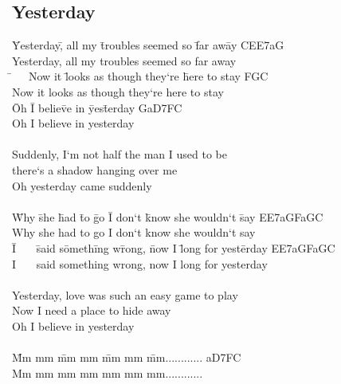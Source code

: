 \documentclass[10pt,a5paper,twoside, cleardoubleplain]{scrbook}
\begin{document}
    \subsection{Yesterday}
  \begin{tabbing}
\=Yesterday\=, all my \=troubles seemed so \=far aw\=ay\kill
\>C\>E\>E7\>a\>G\\
Yesterday, all my troubles seemed so far away\\


\=~~~Now it \=looks as though they`re \=here to stay\kill
\>F\>G\>C\\
Now it looks as though they`re here to stay\\


\=Oh \=I belie\=ve in \=yes\=terday\kill
\>G\>a\>D7\>F\>C\\
Oh I believe in yesterday\\
\\
Suddenly, I`m not half the man I used to be\\
there`s a shadow hanging over me\\
Oh yesterday came suddenly\\

\\
\=Why \=she \=had \=to \=go \=I don`t \=know she wouldn`t \=say\kill
\>E\>E7\>a\>G\>F\>a\>G\>C\\
Why she had to go I don`t know she wouldn`t say\\

\=I~~~ \=said s\=ometh\=ing w\=rong, \=now I \=long for yest\=erday\kill
\>E\>E7\>a\>G\>F\>a\>G\>C\\
I~~~ said something wrong, now I long for yesterday\\
\\
Yesterday, love was such an easy game to play\\
Now I need a place to hide away\\
Oh I believe in yesterday\\
\\
\=Mm mm \=mm mm \=mm mm \=mm............\kill
\>a\>D7\>F\>C\\
Mm mm mm mm mm mm mm............\\
\end{tabbing}

  	
  	  
     \newpage  

   \newpage
\end{document}
